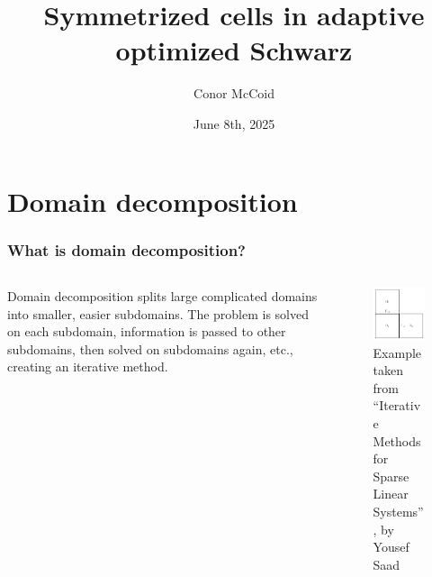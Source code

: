 \documentclass{beamer}
\title{Symmetrized cells in adaptive optimized Schwarz}
\author{Conor McCoid}
\institute{McMaster University}
\date{June 8th, 2025}
\begin{document}
\maketitle

\section{Domain decomposition}

\begin{frame}
\frametitle{What is domain decomposition?}

\begin{columns}
	\begin{column}{0.5\textwidth}
		Domain decomposition splits large complicated domains into smaller, easier subdomains.
		The problem is solved on each subdomain, information is passed to other subdomains, then solved on subdomains again, etc., creating an iterative method.
	\end{column}
	\begin{column}{0.5\textwidth}
		\begin{figure}
			\centering
			\includegraphics[width=\textwidth]{FIG/Saad_Lshape_domains.png}
			\caption{Example taken from ``Iterative Methods for Sparse Linear Systems'', by Yousef Saad}
		\end{figure}
	\end{column}
\end{columns}
\end{frame}
\end{document}
